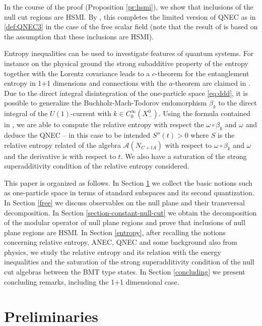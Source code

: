 \documentclass[12pt]{article}
\def\A{{\mathcal A}}
\theoremstyle{remark}
\begin{document}
In the course of the proof (Proposition \ref{pr:hsmi}), we show that inclusions of the null cut regions are HSMI.
By \cite{CF18}, this completes the limited version of QNEC as in \eqref{def:QNEC3} in the case of the free scalar field (note that the result of \cite{CF18} is based on the assumption that these inclusions are HSMI). 

Entropy inequalities can be used to investigate features of quantum systems. For instance on the physical ground the strong subadditive property of the entropy together with the Lorentz covariance leads to a $c$-theorem for the entanglement entropy in 1+1 dimensions
and connections with the $a$-theorem are claimed in \cite{CTT17'}.
Due to the direct integral disintegration of the one-particle space \eqref{eq:ddd}, it is possible to generalize the Buchholz-Mach-Todorov endomorphism $\beta_k$ \cite{BMT88}
to the direct integral of the $U(1)$-current with $k\in C_0^\infty(X^0_-)$. Using the formula contained in \cite{LongoLocalised}, we are able to compute the relative entropy with respect the $\omega\circ \beta_k$ and $\omega$ and deduce the QNEC -- in this case to be intended $S''(t)>0$ where $S$ is the  relative entropy related of the algebra $\A(N_{C+tA})$ with respect to $\omega\circ \beta_k$ and $\omega$ and the derivative is with respect to $t$.
We also have a saturation of the strong superadditivity condition of the relative entropy considered.



This paper is organized as follows.
In Section \ref{preliminaries} we collect the basic notions such as one-particle space in terms of
standard subspaces and its second quantization.
In Section \ref{free} we discuss observables on the null plane and their transversal decomposition.
In Section \ref{section-constant-null-cut} we obtain the decomposition of the modular operator of null plane regions and prove that inclusions of null plane regions are HSMI. In Section \ref{entropy}, after recalling the notions concerning relative entropy, ANEC, QNEC and some background also from physics,
we study the relative entropy and its relation with the energy inequalities and the saturation of the strong superadditivity condition
of the null cut algebras between the BMT type states.
In Section \ref{concluding} we present concluding remarks, including the 1+1 dimensional case.




\section{Preliminaries}\label{preliminaries}
 
\end{document}
